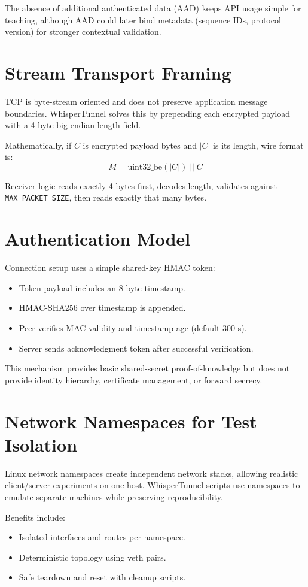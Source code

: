 The absence of additional authenticated data (AAD) keeps API usage simple for teaching, although AAD could later bind metadata (sequence IDs, protocol version) for stronger contextual validation.

\section{Stream Transport Framing}
TCP is byte-stream oriented and does not preserve application message boundaries. WhisperTunnel solves this by prepending each encrypted payload with a 4-byte big-endian length field.

Mathematically, if $C$ is encrypted payload bytes and $|C|$ is its length, wire format is:
\[
M = \text{uint32\_be}(|C|) \; || \; C
\]

Receiver logic reads exactly 4 bytes first, decodes length, validates against \texttt{MAX\_PACKET\_SIZE}, then reads exactly that many bytes.

\section{Authentication Model}
Connection setup uses a simple shared-key HMAC token:
\begin{itemize}[leftmargin=2em]
\item Token payload includes an 8-byte timestamp.
\item HMAC-SHA256 over timestamp is appended.
\item Peer verifies MAC validity and timestamp age (default 300 s).
\item Server sends acknowledgment token after successful verification.
\end{itemize}

This mechanism provides basic shared-secret proof-of-knowledge but does not provide identity hierarchy, certificate management, or forward secrecy.

\section{Network Namespaces for Test Isolation}
Linux network namespaces create independent network stacks, allowing realistic client/server experiments on one host. WhisperTunnel scripts use namespaces to emulate separate machines while preserving reproducibility.

Benefits include:
\begin{itemize}[leftmargin=2em]
\item Isolated interfaces and routes per namespace.
\item Deterministic topology using veth pairs.
\item Safe teardown and reset with cleanup scripts.
\end{itemize}

